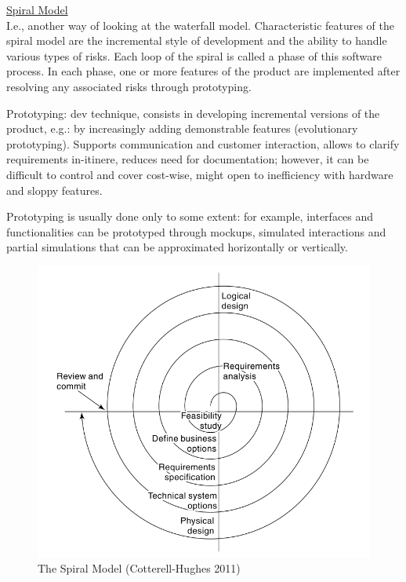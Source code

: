 \noindent \underline{Spiral Model}\\
\noindent I.e., another way of looking at the waterfall model. Characteristic features of the spiral model are the incremental style of development and the ability to handle various types of risks. Each loop of the spiral is called a phase of this software process. In each phase, one or more features of the product are implemented after resolving any associated risks through 
prototyping.

 \noindent Prototyping: dev technique, consists in developing incremental versions of the product, e.g.: by increasingly adding demonstrable features (evolutionary prototyping). Supports communication and customer interaction, allows to clarify requirements in-itinere, reduces need for documentation; however, it can be difficult to control and cover cost-wise, might open to inefficiency with hardware and sloppy features.

\noindent Prototyping is usually done only to some extent: for example, interfaces and functionalities can be prototyped through mockups, simulated interactions and partial simulations that can be approximated horizontally or vertically.

\begin{figure} [H]
    \centering
    \includegraphics[scale=0.4]{Figures/01/spiral00.png}
    \caption{The Spiral Model (Cotterell-Hughes 2011)}
    \label{fig:sm1}
\end{figure}

